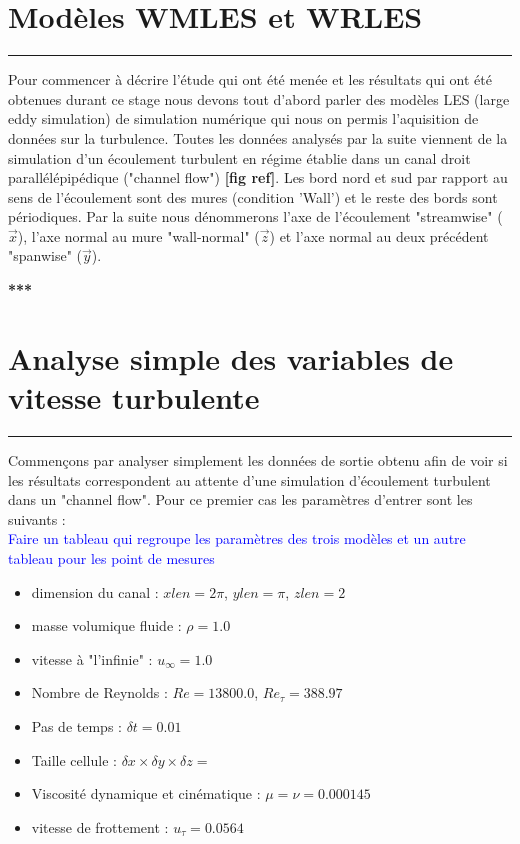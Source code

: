 \documentclass[12pt]{article}
\theoremstyle{plain}
\theoremstyle{remark}
\newcommand{\vect}{\overrightarrow}
\begin{document}
\vspace{0.4cm}	
\section{Modèles WMLES et WRLES}
\noindent\rule{\linewidth}{0.3pt}
\vspace{0.3cm}

Pour commencer à décrire l'étude qui ont été menée et les résultats qui ont été obtenues durant ce stage nous devons tout d'abord parler des modèles LES (large eddy simulation) de simulation numérique qui nous on permis l'aquisition de données sur la turbulence. Toutes les données analysés par la suite viennent de la simulation d'un écoulement turbulent en régime établie dans un canal droit parallélépipédique ("channel flow") {\bf[fig ref]}. Les bord nord et sud par rapport au sens de l'écoulement sont des mures (condition 'Wall') et le reste des bords sont périodiques. Par la suite nous dénommerons l'axe de l'écoulement "streamwise" ($\vect{x}$), l'axe normal au mure "wall-normal" ($\vect{z}$) et l'axe normal au deux précédent "spanwise" ($\vect{y}$).

\begin{center}
	\large {\bf{***}}
\end{center}

\vspace{0.4cm}
\section{Analyse simple des variables de vitesse turbulente}
\noindent\rule{\linewidth}{0.3pt}
\vspace{0.3cm}

Commençons par analyser simplement les données de sortie obtenu afin de voir si les résultats correspondent au attente d'une simulation d'écoulement turbulent dans un "channel flow". Pour ce premier cas les paramètres d'entrer sont les suivants : \\

\textcolor{blue}{Faire un tableau qui regroupe les paramètres des trois modèles et un autre tableau pour les point de mesures}
\begin{itemize}
	\item dimension du canal : $xlen = 2\pi$, $ylen = \pi$, $zlen = 2$
	\item masse volumique fluide : $\rho = 1.0$
	\item vitesse à "l'infinie" : $u_{\infty} = 1.0$
	\item Nombre de Reynolds : $Re = 13800.0$, $Re_{\tau} = 388.97$
	\item Pas de temps : $\delta t = 0.01$
	\item Taille cellule : $\delta x \times \delta y \times \delta z = $
	\item Viscosité dynamique et cinématique : $\mu = \nu = 0.000145$
	\item vitesse de frottement : $u_{\tau} = 0.0564$
\end{itemize}
\end{document}
